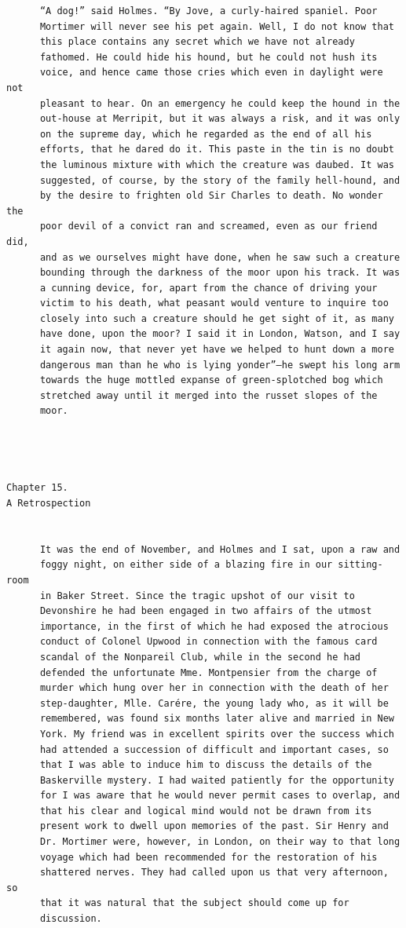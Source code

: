 \documentclass{article}
\begin{document}
\begin{verbatim}
      “A dog!” said Holmes. “By Jove, a curly-haired spaniel. Poor
      Mortimer will never see his pet again. Well, I do not know that
      this place contains any secret which we have not already
      fathomed. He could hide his hound, but he could not hush its
      voice, and hence came those cries which even in daylight were not
      pleasant to hear. On an emergency he could keep the hound in the
      out-house at Merripit, but it was always a risk, and it was only
      on the supreme day, which he regarded as the end of all his
      efforts, that he dared do it. This paste in the tin is no doubt
      the luminous mixture with which the creature was daubed. It was
      suggested, of course, by the story of the family hell-hound, and
      by the desire to frighten old Sir Charles to death. No wonder the
      poor devil of a convict ran and screamed, even as our friend did,
      and as we ourselves might have done, when he saw such a creature
      bounding through the darkness of the moor upon his track. It was
      a cunning device, for, apart from the chance of driving your
      victim to his death, what peasant would venture to inquire too
      closely into such a creature should he get sight of it, as many
      have done, upon the moor? I said it in London, Watson, and I say
      it again now, that never yet have we helped to hunt down a more
      dangerous man than he who is lying yonder”—he swept his long arm
      towards the huge mottled expanse of green-splotched bog which
      stretched away until it merged into the russet slopes of the
      moor.




Chapter 15.
A Retrospection


      It was the end of November, and Holmes and I sat, upon a raw and
      foggy night, on either side of a blazing fire in our sitting-room
      in Baker Street. Since the tragic upshot of our visit to
      Devonshire he had been engaged in two affairs of the utmost
      importance, in the first of which he had exposed the atrocious
      conduct of Colonel Upwood in connection with the famous card
      scandal of the Nonpareil Club, while in the second he had
      defended the unfortunate Mme. Montpensier from the charge of
      murder which hung over her in connection with the death of her
      step-daughter, Mlle. Carére, the young lady who, as it will be
      remembered, was found six months later alive and married in New
      York. My friend was in excellent spirits over the success which
      had attended a succession of difficult and important cases, so
      that I was able to induce him to discuss the details of the
      Baskerville mystery. I had waited patiently for the opportunity
      for I was aware that he would never permit cases to overlap, and
      that his clear and logical mind would not be drawn from its
      present work to dwell upon memories of the past. Sir Henry and
      Dr. Mortimer were, however, in London, on their way to that long
      voyage which had been recommended for the restoration of his
      shattered nerves. They had called upon us that very afternoon, so
      that it was natural that the subject should come up for
      discussion.


\end{verbatim}
\end{document}
